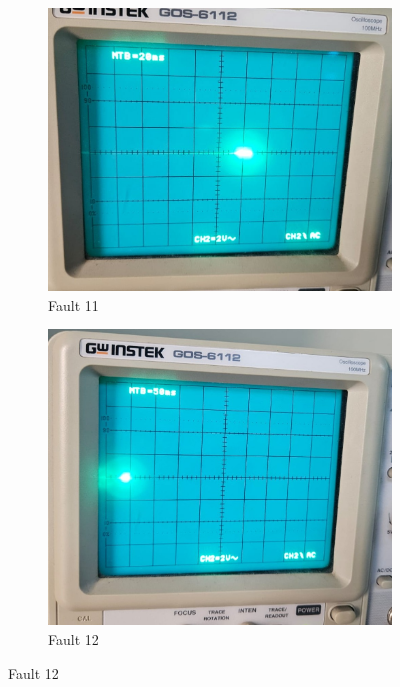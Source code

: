 \documentclass[a4paper,12pt]{article}
\begin{document}
\begin{figure}[H]
	\begin{subfigure}[t]{0.44\textwidth}
		\centering
		\includegraphics[width=1\linewidth]{Images/1.11}
		\caption{Fault 11}
		\vspace{0.1cm}
	\end{subfigure}
	\hfil
	\begin{subfigure}[t]{0.44\textwidth}
		\centering
		\includegraphics[width=1\linewidth]{Images/1.12}
		\caption{Fault 12}
		\vspace{0.1cm}
	\end{subfigure}
	

\end{figure}
\end{document}
